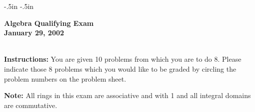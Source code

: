 



\pagestyle{empty}
%
%

\oddsidemargin -.5in
\evensidemargin -.5in
\topmargin -0.5in 
\textwidth 7.0in
\textheight 9.0in

\newcommand{\C}{{\Bbb C}}
\newcommand{\Q}{{\Bbb Q}}
\newcommand{\Z}{{\Bbb Z}}
\newcommand{\F}{{\Bbb F}}
\newcommand{\Gal}{\mbox{\rm Gal}}
\newcommand{\Aut}{\mbox{\rm Aut}}


\begin{center}\begin{LARGE}
{\bf  Algebra Qualifying Exam}\\ 
{\bf January  29, 2002}\\
\end{LARGE}
\end{center}
\vspace{0.1in}
\noindent\hrulefill\\
{\bf Instructions:} You are given 10 problems from which you are to do 8.
 Please indicate those  8 problems which you would like  to be graded 
by circling the problem numbers on the  problem sheet.  

\vspace{0.2in}

{\bf Note:} All rings in this exam are associative and with 1 and 
all integral domains are commutative.




\vspace{0.2in}

